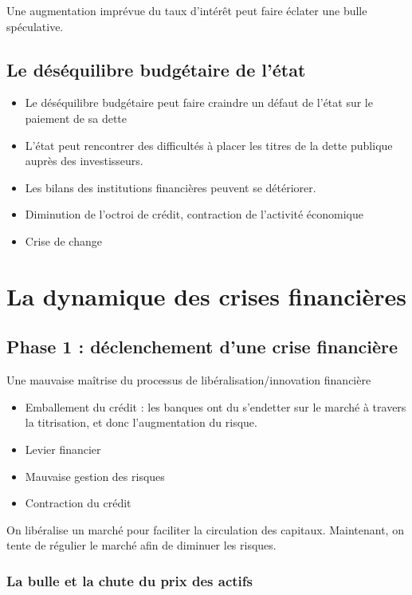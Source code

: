 	Une augmentation imprévue du taux d'intérêt peut faire éclater une bulle spéculative.

	\subsection{Le déséquilibre budgétaire de l'état}
	
	\begin{itemize}
		\item Le déséquilibre budgétaire peut faire craindre un défaut de l'état sur le paiement de sa dette 
		\item L'état peut rencontrer des difficultés à placer les titres de la dette publique auprès des investisseurs. 
		\item Les bilans des institutions financières peuvent se détériorer. 
		\item Diminution de l'octroi de crédit, contraction de l'activité économique
		\item Crise de change
	\end{itemize}


\section{La dynamique des crises financières}

	
	\subsection{Phase 1 : déclenchement d'une crise financière}
	
	Une mauvaise maîtrise du processus de libéralisation/innovation financière 
\begin{itemize}
	\item Emballement du crédit : les banques ont du s'endetter sur le marché à travers la titrisation, et donc l'augmentation du risque.
	\item Levier financier 
	\item Mauvaise gestion des risques 
	\item Contraction du crédit 
\end{itemize}

	On libéralise un marché pour faciliter la circulation des capitaux. Maintenant, on tente de régulier le marché afin de diminuer les risques.

	\subsubsection{La bulle et la chute du prix des actifs}
	
